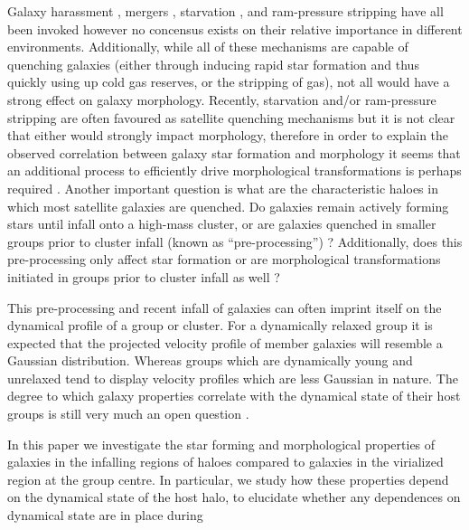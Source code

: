 \documentclass[a4paper,fleqn,usenatbib]{mnras}
\begin{document}
Galaxy harassment \citep[e.g.][]{moore1996}, mergers \citep[e.g.][]{mihos1994},
starvation \citep[e.g.][]{kawata2008}, and ram-pressure stripping
\citep[e.g.][]{gunn1972} have all been invoked however no concensus
exists on their relative importance in different environments.
Additionally, while all of these mechanisms are capable of
quenching galaxies (either through inducing rapid star formation and
thus quickly using up cold gas reserves, or
the stripping of gas), not all would have a strong effect on galaxy
morphology.  Recently, starvation and/or ram-pressure stripping are
often favoured
as satellite quenching mechanisms \citep{muzzin2014, peng2015, fillingham2015,
  weisz2015, wetzel2015} but it is not clear that either
would strongly impact morphology, therefore in order to explain the
observed correlation between galaxy star formation and morphology it
seems that an additional process to efficiently drive morphological
transformations is perhaps required \citep[e.g.][]{christlein2004}.
Another important question is what are
the characteristic haloes in which most satellite galaxies are
quenched.  Do galaxies remain actively forming stars until infall onto
a high-mass cluster, or are galaxies quenched in smaller groups prior
to cluster infall (known as ``pre-processing'') \citep{fujita2004, mcgee2009, cybulski2014,
  hou2014, haines2015, just2015}?  Additionally, does this pre-processing only
affect star formation or are morphological transformations initiated
in groups prior to cluster infall as well \citep{kodama2001, moran2007}? 
\par
This pre-processing and recent infall of galaxies can often imprint
itself on the dynamical profile of a group or cluster.  For a
dynamically relaxed group it is expected that the projected velocity profile of member
galaxies will resemble a Gaussian distribution.  Whereas groups which
are dynamically young and unrelaxed tend to display velocity
profiles which are less Gaussian in nature.  The degree to which
galaxy properties correlate with the dynamical state of their host
groups is still very much an open question \citep{biviano2002,
  ribeiro2010, hou2013, ribeiro2013, ribeiro2013b}.
\par
In this paper we investigate the star forming and
morphological properties of galaxies in the infalling regions of haloes
compared to
galaxies in the virialized region at the group centre.  In particular, we study how
these properties depend on the dynamical state of the host halo, to
elucidate whether any dependences on dynamical state are in place during
\end{document}

